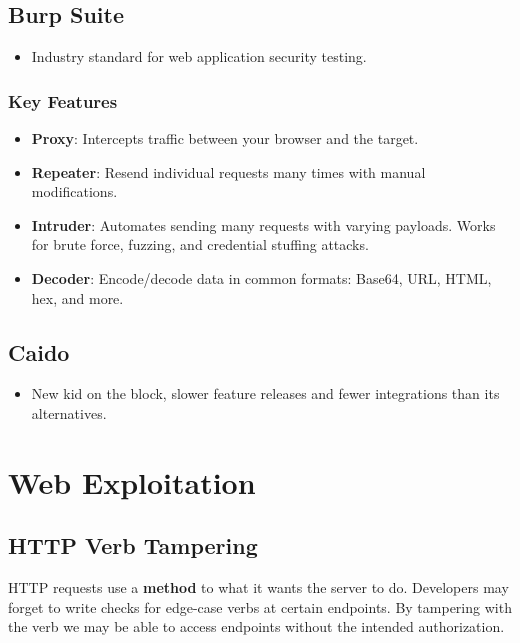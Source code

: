 \documentclass[12pt, letterpaper]{article}
\begin{document}
\subsection*{Burp Suite}

\begin{itemize}
    \item Industry standard for web application security testing.
\end{itemize}

\subsubsection*{Key Features}

\begin{itemize}
    \item \textbf{Proxy}: Intercepts traffic between your browser and the target.
    \item \textbf{Repeater}: Resend individual requests many times with manual modifications.
    \item \textbf{Intruder}: Automates sending many requests with varying payloads. Works for brute force, fuzzing, and credential stuffing attacks.
    \item \textbf{Decoder}: Encode/decode data in common formats: Base64, URL, HTML, hex, and more.
\end{itemize}

\subsection*{Caido}
\begin{itemize}
    \item New kid on the block, slower feature releases and fewer integrations than its alternatives.
\end{itemize}


\section*{Web Exploitation}

\subsection*{HTTP Verb Tampering}

HTTP requests use a \textbf{method} to what it wants the server to do. Developers may forget to write checks for edge-case verbs at certain endpoints. By tampering with the verb we may be able to access endpoints without the intended authorization.
\end{document}
